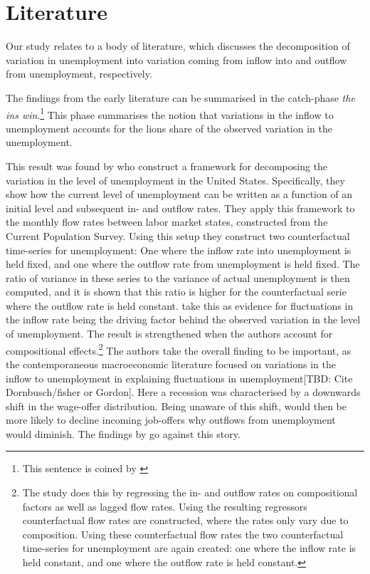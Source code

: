 \section{Literature}
\label{sec:litt}

Our study relates to a body of literature, which discusses the decomposition of variation in unemployment into variation coming from inflow into and outflow from unemployment, respectively. 

The findings from the early literature can be summarised in the catch-phase \emph{the ins win}.\footnote{This sentence is coined by \cite{Darby1986}} This phase summarises the notion that variations in the inflow to unemployment accounts for the lions share of the observed variation in the unemployment.

This result was found by \cite{Darby1986} who construct a framework for decomposing the variation in the level of unemployment in the United States. Specifically, they show how the current level of unemployment can be written as a function of an initial level and subsequent in- and outflow rates. They apply this framework to the monthly flow rates between labor market states, constructed from the Current Population Survey. Using this setup they construct two counterfactual time-series for unemployment: One where the inflow rate into unemployment is held fixed, and one where the outflow rate from unemployment is held fixed. The ratio of variance in these series to the variance of actual unemployment is then computed, and it is shown that this ratio is higher for the counterfactual serie where the outflow rate is held constant. \cite{Darby1986} take this as evidence for fluctuations in the inflow rate being the driving factor behind the observed variation in the level of unemployment. The result is strengthened when the authors account for compositional effects.\footnote{The study does this by regressing the in- and outflow rates on compositional factors as well as lagged flow  rates. Using the resulting regressors counterfactual flow rates are constructed, where the rates only vary due to composition. Using these counterfactual flow rates the two counterfactual time-series for unemployment are again created: one where the inflow rate is held constant, and one where the outflow rate is held constant.}  The authors take the overall finding to be important, as the contemporaneous macroeconomic literature focused on variations in the inflow to unemployment in explaining fluctuations in unemployment[TBD: Cite Dornbusch/fisher or Gordon]. Here a recession was characterised by a downwards shift in the wage-offer distribution. Being unaware of this shift, would then be more likely to decline incoming job-offers why outflows from unemployment would diminish. The findings by \cite{Darby1986} go against this story.

